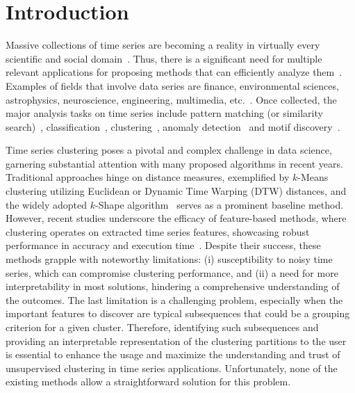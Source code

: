\section{Introduction}
\label{sec:intro}
Massive collections of time series are becoming a reality in virtually every scientific and social domain~\cite{Palpanas2019,MAHDAVINEJAD2018161}. 
Thus, there is a significant need for multiple relevant applications for proposing methods that can efficiently analyze them~\cite{DBLP:journals/dagstuhl-reports/BagnallCPZ19}. 
Examples of fields that involve data series are finance, environmental sciences, astrophysics, neuroscience, engineering, multimedia, etc.~\cite{fulfillingtheneed,DBLP:journals/dagstuhl-reports/BagnallCPZ19}. 
Once collected, the major analysis tasks on  time series include pattern matching (or similarity search)~\cite{c19-isip-Palpanas-isaxfamily, DBLP:journals/tkde/PengFP21, seanet}, classification~\cite{DBLP:journals/datamine/YeK11,DBLP:conf/cikm/SchaferL17, DBLP:journals/datamine/TanPW20, inceptionTime}, clustering~\cite{DBLP:conf/sdm/UlanovaBK15,DBLP:journals/sigmod/PaparrizosG16,DBLP:conf/ijcai/Li0Z19}, anomaly detection~\cite{benchref,Series2GraphPaper,DBLP:conf/edbt/Gao0B20,normajournal,DBLP:journals/pvldb/BoniolPPF21} and motif discovery~\cite{DBLP:journals/tkde/ZhuMK21}.


Time series clustering poses a pivotal and complex challenge in data science, garnering substantial attention with many proposed algorithms in recent years. Traditional approaches hinge on distance measures, exemplified by $k$-Means clustering utilizing Euclidean or Dynamic Time Warping (DTW) distances, and the widely adopted $k$-Shape algorithm~\cite{DBLP:journals/sigmod/PaparrizosG16} serves as a prominent baseline method.
However, recent studies underscore the efficacy of feature-based methods, where clustering operates on extracted time series features, showcasing robust performance in accuracy and execution time~\cite{bonifati2022time2feat}. 
Despite their success, these methods grapple with noteworthy limitations: (i) susceptibility to noisy time series, which can compromise clustering performance, and (ii) a need for more interpretability in most solutions, hindering a comprehensive understanding of the outcomes. The last limitation is a challenging problem, especially when the important features to discover are typical subsequences that could be a grouping criterion for a given cluster. Therefore, identifying such subsequences and providing an interpretable representation of the clustering partitions to the user is essential to enhance the usage and maximize the understanding and trust of unsupervised clustering in time series applications. Unfortunately, none of the existing methods allow a straightforward solution for this problem.

